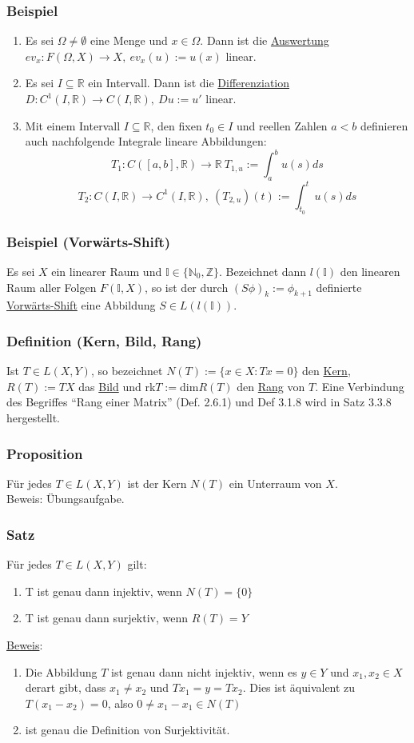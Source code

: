 \subsubsection{Beispiel}
\begin{enumerate}
\item Es sei $\Omega \not= \emptyset$ eine Menge und $x\in \Omega$.  Dann ist die \underline{Auswertung} $ev_x: F(\Omega ,X)\rightarrow X,\ ev_x(u):=u(x)$ linear.
\item Es sei $I\subseteq \mathbb{R}$ ein Intervall.  Dann ist die \underline{Differenziation} $D:C^1(I,\mathbb{R})\rightarrow C(I,\mathbb{R}),\ Du:=u'$ linear.
\item Mit einem Intervall $I\subseteq \mathbb{R}$, den fixen $t_0\in I$ und reellen Zahlen $a<b$ definieren auch nachfolgende Integrale lineare Abbildungen:
\[T_1:C([a,b],\mathbb{R})\rightarrow \mathbb{R}\ T_{1,u}:=\int_a^b u(s)ds\]
\[T_2:C(I,\mathbb{R})\rightarrow C^1(I,\mathbb{R}),\ (T_{2,u})(t):=\int_{t_0}^t u(s)ds\]
\end{enumerate}
\subsubsection{Beispiel (Vorwärts-Shift)}
Es sei $X$ ein linearer Raum und $\mathbb{I}\in\{\mathbb{N}_0,\mathbb{Z}\}$.  Bezeichnet dann $l(\mathbb{I})$ den linearen Raum aller Folgen $F(\mathbb{I},X)$, so ist der durch $(S\phi )_k:=\phi _{k+1}$ definierte \underline{Vorwärts-Shift} eine Abbildung $S\in L(l(\mathbb{I}))$.
\subsubsection{Definition (Kern, Bild, Rang)}
Ist $T\in L(X,Y)$, so bezeichnet $N(T):=\{x\in X:Tx=0\}$ den \underline{Kern}, $R(T):=TX$ das \underline{Bild} und rk$T:=$dim$R(T)$ den \underline{Rang} von $T$.  Eine Verbindung des Begriffes "`Rang einer Matrix"' (Def. 2.6.1) und Def 3.1.8 wird in Satz 3.3.8 hergestellt.
\subsubsection{Proposition}
Für jedes $T\in L(X,Y)$ ist der Kern $N(T)$ ein Unterraum von $X$.\\
Beweis: Übungsaufgabe.
\subsubsection{Satz}
Für jedes $T\in L(X,Y)$ gilt:
\renewcommand{\labelenumi}{(\alph{enumi})}
\begin{enumerate}
\item T ist genau dann injektiv, wenn $N(T)=\{0\}$
\item T ist genau dann surjektiv, wenn $R(T)=Y$
\end{enumerate}
\underline{Beweis}:
\begin{enumerate}
\item Die Abbildung $T$ ist genau dann nicht injektiv, wenn es $y\in Y$ und $x_1,x_2\in X$ derart gibt, dass $x_1\not= x_2$ und $Tx_1=y=Tx_2$.  Dies ist äquivalent zu $T(x_1-x_2)=0$, also $0 \not= x_1-x_1 \in N(T)$
\item ist genau die Definition von Surjektivität.
\end{enumerate}
